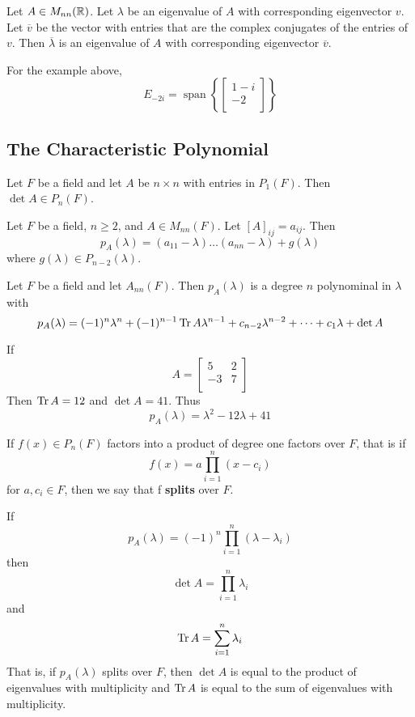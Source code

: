 \documentclass{article}
\DeclareMathOperator{\spn}{span}
\begin{document}
\begin{theorem}
  Let $A \in M_{nn}(\mathbb{R})$. Let $\lambda$ be an eigenvalue of $A$ with corresponding eigenvector $v$. Let $\overline{v}$ be the vector with entries that are the complex conjugates of the entries of $v$. Then $\overline{\lambda}$ is an eigenvalue of $A$ with corresponding eigenvector $\overline{v}$.
\end{theorem}
\begin{example}
  For the example above, \[
    E_{-2i} = \spn \left\{
    \begin{bmatrix}
      1 - i \\
      -2    \\
    \end{bmatrix}\right\}
  \]
\end{example}
\subsection{The Characteristic Polynomial}
\begin{theorem}
  Let $F$ be a field and let $A$ be $n \times n$ with entries in $P_1(F)$. Then $\det A \in P_n(F)$.
\end{theorem}
\begin{theorem}
  Let $F$ be a field, $n \geq 2$, and $A \in M_{nn}(F)$. Let $[A]_{ij} = a_{ij}$. Then \[
    p_A(\lambda) = (a_{11} - \lambda)\dots(a_{nn} - \lambda) + g(\lambda)
  \] where $g(\lambda) \in P_{n-2}(\lambda)$.
\end{theorem}
\begin{theorem}
  Let $F$ be a field and let $A_{nn}(F)$. Then $p_A(\lambda)$ is a degree $n$ polynominal in $\lambda$ with \[
    p_A(\lambda) = (-1)^n\lambda^n + (-1)^{n-1}\Tr A\lambda^{n-1} + c_{n-2}\lambda^{n-2} + \dots + c_1\lambda + \det A
  \]
\end{theorem}
\begin{example}
  If \[
    A =
    \begin{bmatrix}
      5  & 2 \\
      -3 & 7 \\
    \end{bmatrix}
  \]
  Then $\Tr A =  12$ and $\det A = 41$. Thus \[
    p_A(\lambda) = \lambda^2 - 12\lambda + 41
  \]
\end{example}
\begin{definition}
  If $f(x) \in P_n(F)$ factors into a product of degree one factors over $F$, that is if \[
    f(x) = a\prod_{i=1}^n (x-c_i)
  \] for $a, c_i \in F$, then we say that f \textbf{splits} over $F$.
\end{definition}
\begin{theorem}
  If \[
    p_A(\lambda) = (-1)^n \prod_{i=1}^n (\lambda - \lambda_i)
  \] then \[
    \det A = \prod_{i=1}^n \lambda_i
  \] and \[
    \Tr A = \sum_{i=1}^n \lambda_i
  \]
  That is, if $p_A(\lambda)$ splits over $F$, then $\det A$ is equal to the product of eigenvalues with multiplicity and $\Tr A$ is equal to the sum of eigenvalues with multiplicity.
\end{theorem}
\end{document}
